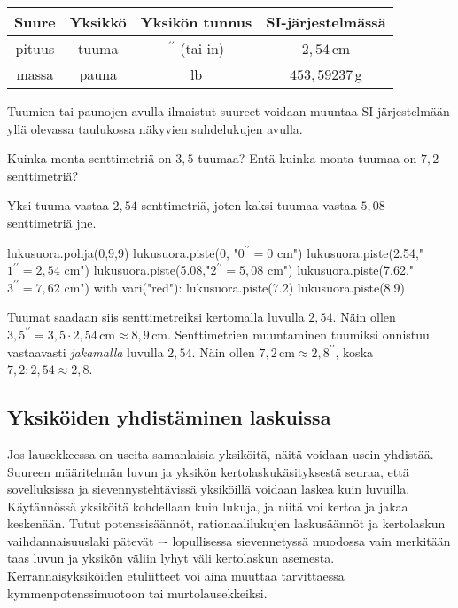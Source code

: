 \begin{tabular}{c|c|c|c}
Suure & Yksikkö & Yksikön tunnus & SI-järjestelmässä\\
\hline
pituus & tuuma & $^{\prime \prime}$ (tai in) & $2,54$\,cm \\
massa & pauna & lb & $453,59237$\,g \\
\end{tabular}

Tuumien tai paunojen avulla ilmaistut suureet voidaan muuntaa SI-järjestelmään yllä olevassa taulukossa näkyvien suhdelukujen avulla.

\begin{esimerkki}
Kuinka monta senttimetriä on $3,5$ tuumaa? Entä kuinka monta tuumaa on $7,2$ senttimetriä?
	\begin{esimratk}
Yksi tuuma vastaa $2,54$ senttimetriä, joten kaksi tuumaa vastaa $5,08$ senttimetriä jne.
	
\begin{kuva}
	lukusuora.pohja(0,9,9)
	lukusuora.piste(0, "$0^{\prime \prime} = 0 $ cm")
	lukusuora.piste(2.54,"$1^{\prime \prime} = 2,54$ cm")
	lukusuora.piste(5.08,"$2^{\prime \prime} = 5,08$ cm")
	lukusuora.piste(7.62,"$3^{\prime \prime} = 7,62$ cm")
	with vari("red"):
	  lukusuora.piste(7.2)
	  lukusuora.piste(8.9)
\end{kuva}

Tuumat saadaan siis senttimetreiksi kertomalla luvulla $2,54$. Näin ollen $3,5^{\prime \prime} = 3,5 \cdot 2,54\,\textrm{cm} \approx 8,9\,$cm. Senttimetrien muuntaminen tuumiksi onnistuu vastaavasti \emph{jakamalla} luvulla $2,54$. Näin ollen $7,2\,\textrm{cm} \approx 2,8^{\prime \prime}$, koska $7,2:2,54 \approx 2,8$.
	\end{esimratk}
\end{esimerkki}

\subsection*{Yksiköiden yhdistäminen laskuissa}

Jos lausekkeessa on useita samanlaisia yksiköitä, näitä voidaan usein yhdistää. Suureen määritelmän luvun ja yksikön kertolaskukäsityksestä seuraa, että sovelluksissa ja sievennystehtävissä yksiköillä voidaan laskea kuin luvuilla. Käytännössä yksiköitä kohdellaan kuin lukuja, ja niitä voi kertoa ja jakaa keskenään. Tutut potenssisäännöt, rationaalilukujen laskusäännöt ja kertolaskun vaihdannaisuuslaki pätevät –- lopullisessa sievennetyssä muodossa vain merkitään taas luvun ja yksikön väliin lyhyt väli kertolaskun asemesta. Kerrannaisyksiköiden etuliitteet voi aina muuttaa tarvittaessa kymmenpotenssimuotoon tai murtolausekkeiksi.

